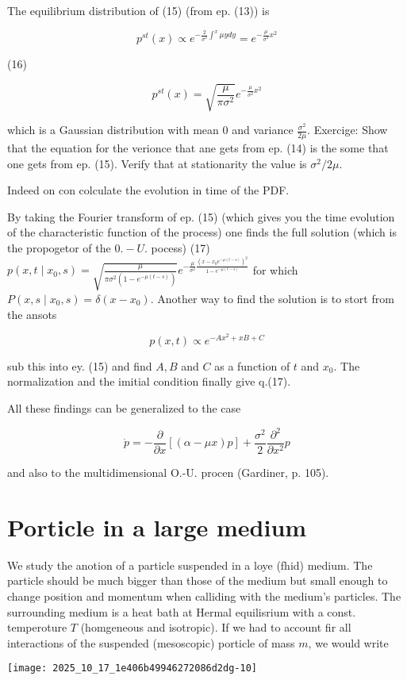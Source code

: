 The equilibrium distribution of (15) (from ep. (13)) is

$$ p^{s t}(x) \propto e^{-\frac{2}{\sigma^{2}} \int^{x} \mu y d y}=e^{-\frac{\mu}{\sigma^{2}} x^{2}} $$

(16)

$$ p^{s t}(x)=\sqrt{\frac{\mu}{\pi \sigma^{2}}} e^{-\frac{\mu}{\sigma^{2}} x^{2}} $$

which is a Gaussian distribution with mean 0 and variance $\frac{\sigma^{2}}{2 \mu}$.
Exercige: Show that the equation for the verionce that ane gets from ep. (14) is the some that one gets from ep. (15). Verify that at stationarity the value is $\sigma^{2} / 2 \mu$.

Indeed on con colculate the evolution in time of the PDF.

By taking the Fourier transform of ep. (15) (which gives you the time evolution of the characteristic function of the process) one finds the full solution (which is the propogetor of the $0 .-U$. pocess)
(17) $p\left(x, t \mid x_{0}, s\right)=\sqrt{\frac{\mu}{\pi \sigma^{2}\left(1-e^{-\mu(t-s)}\right)}} e^{-\frac{\mu}{\sigma^{2}} \frac{\left(x-x_{0} e^{-\mu(t-s)}\right)^{2}}{1-e^{-\mu(t-s)}}}$
for which $P\left(x, s \mid x_{0}, s\right)=\delta\left(x-x_{0}\right)$. Another way to find the solution is to stort from the ansots

$$ p(x, t) \propto e^{-A x^{2}+x B+C} $$

sub this into ey. (15) and find $A, B$ and $C$ as a function of $t$ and $x_{0}$. The normalization and the imitial condition finally give q.(17).

All these findings can be generalized to the case

$$ \dot{p}=-\frac{\partial}{\partial x}[(\alpha-\mu x) p]+\frac{\sigma^{2}}{2} \frac{\partial^{2}}{\partial x^{2}} p $$

and also to the multidimensional O.-U. procen (Gardiner, p. 105).

\section*{Porticle in a large medium}
We study the anotion of a particle suspended in a loye (fhid) medium. The particle should be much bigger than those of the medium but small enough to change position and momentum when calliding with the medium's particles. The surrounding medium is a heat bath at Hermal equilisrium with a const. temperoture $T$ (homgeneous and isotropic).
If we had to account fir all interactions of the suspended (mesoscopic) porticle of mass $m$, we would write
\begin{center}
\texttt{[image: 2025\_10\_17\_1e406b49946272086d2dg-10]}
\end{center}

